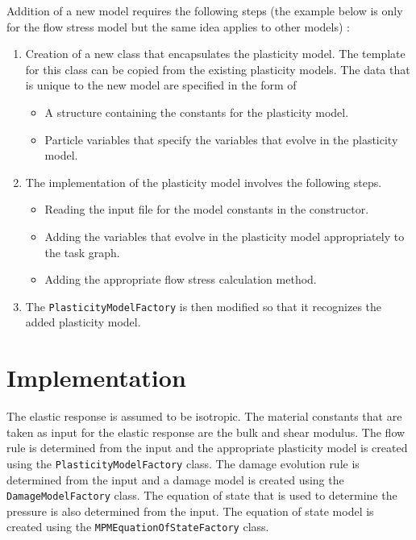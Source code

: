 Addition of a new model requires the following steps (the example below is only
for the flow stress model but the same idea applies to other models) :
\begin{enumerate}
    \item Creation of a new class that encapsulates the plasticity 
    model.  The template for this class can be copied from the
    existing plasticity models.  The data that is unique to 
    the new model are specified in the form of 
    \begin{itemize}
      \item A structure containing the constants for the plasticity
            model.
      \item Particle variables that specify the variables that 
            evolve in the plasticity model.
    \end{itemize}
    \item The implementation of the plasticity model involves the
    following steps.
    \begin{itemize}
      \item Reading the input file for the model constants in the
            constructor.
      \item Adding the variables that evolve in the plasticity model
            appropriately to the task graph.
      \item Adding the appropriate flow stress calculation method.
    \end{itemize}
    \item The \verb+PlasticityModelFactory+ is then modified so that
          it recognizes the added plasticity model.
\end{enumerate}

\section{Implementation}
The elastic response is assumed to be isotropic.  The material
constants that are taken as input for the elastic response are the
bulk and shear modulus.  The flow rule is determined from the input
and the appropriate plasticity model is created using the 
\verb+PlasticityModelFactory+ class.  The damage evolution rule
is determined from the input and a damage model is created using
the \verb+DamageModelFactory+ class.  The equation of state 
that is used to determine the pressure is also determined from the
input.  The equation of state model is created using the 
\verb+MPMEquationOfStateFactory+ class.

